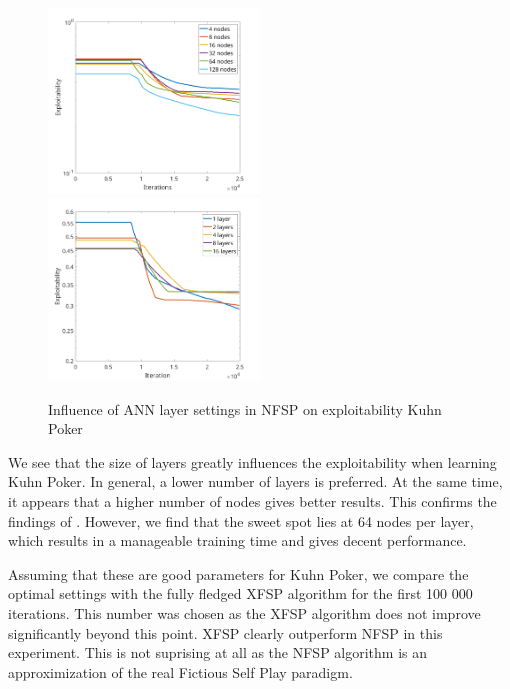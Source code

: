 \documentclass[10pt,a4paper]{article}
\begin{document}
\begin{center}
\begin{figure}[h]
\label{fig:layers_kuhn}
\includegraphics[width=0.5\textwidth]{Figures/kuhn_nodes.png}
\includegraphics[width=0.5\textwidth]{Figures/kuhn_layers.png}
\caption{Influence of ANN layer settings in NFSP on exploitability Kuhn Poker}
\end{figure}
\end{center}

We see that the size of layers greatly influences the exploitability when learning Kuhn Poker. In general, a lower number of layers is preferred. At the same time, it appears that a higher number of nodes gives better results. This confirms the findings of \citeauthor{heinrichphd} \cite{heinrichphd}. However, we find that the sweet spot lies at 64 nodes per layer, which results in a manageable training time and gives decent performance.


Assuming that these are good parameters for Kuhn Poker, we compare the optimal settings with the fully fledged XFSP algorithm for the first 100 000 iterations. This number was chosen as the XFSP algorithm does not improve significantly beyond this point. XFSP clearly outperform NFSP in this experiment. This is not suprising at all as the NFSP algorithm is an approximization of the real Fictious Self Play paradigm.
\end{document}
